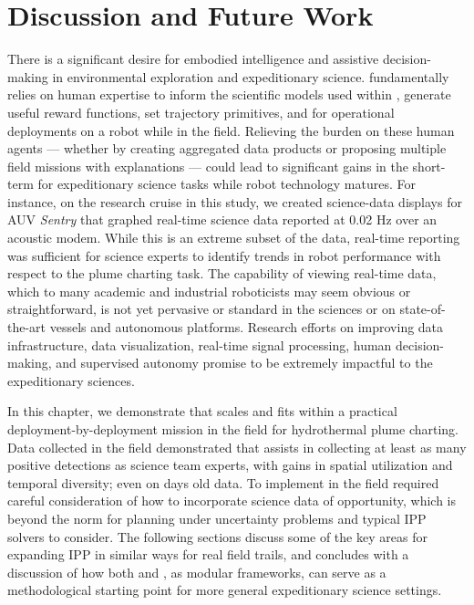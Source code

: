 \section{Discussion and Future Work}
\label{sec:future}
There is a significant desire for embodied intelligence and assistive decision-making in environmental exploration and expeditionary science. \PHORTEX fundamentally relies on human expertise to inform the scientific models used within \PHUMES, generate useful reward functions, set trajectory primitives, and for operational deployments on a robot while in the field. Relieving the burden on these human agents --- whether by creating aggregated data products or proposing multiple field missions with explanations --- could lead to significant gains in the short-term for expeditionary science tasks while robot technology matures. For instance, on the research cruise in this study, we created science-data displays for AUV \emph{Sentry} that graphed real-time science data reported at 0.02 Hz over an acoustic modem. While this is an extreme subset of the data, real-time reporting was sufficient for science experts to identify trends in robot performance with respect to the plume charting task. The capability of viewing real-time data, which to many academic and industrial roboticists may seem obvious or straightforward, is not yet pervasive or standard in the sciences or on state-of-the-art vessels and autonomous platforms. Research efforts on improving data infrastructure, data visualization, real-time signal processing, human decision-making, and supervised autonomy promise to be extremely impactful to the expeditionary sciences. 

In this chapter, we demonstrate that \PHORTEX scales and fits within a practical deployment-by-deployment mission in the field for hydrothermal plume charting. Data collected in the field demonstrated that \PHORTEX assists in collecting at least as many positive detections as science team experts, with gains in spatial utilization and temporal diversity; even on days old data. To implement \PHORTEX in the field required careful consideration of how to incorporate science data of opportunity, which is beyond the norm for planning under uncertainty problems and typical IPP solvers to consider. The following sections discuss some of the key areas for expanding IPP in similar ways for real field trails, and concludes with a discussion of how both \PHORTEX and \PHUMES, as modular frameworks, can serve as a methodological starting point for more general expeditionary science settings.

